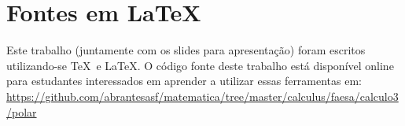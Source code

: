 \section{Fontes em \LaTeX}
\label{sec:fontes}

Este trabalho (juntamente com os slides para apresentação) foram escritos
utilizando-se \TeX\ e \LaTeX. O código fonte deste trabalho está disponível
online para estudantes interessados em aprender a utilizar essas ferramentas em:
\url{https://github.com/abrantesasf/matematica/tree/master/calculus/faesa/calculo3/polar}
